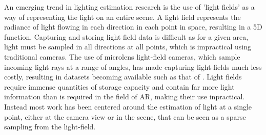 \documentclass[ %
                    author={Gavin Parker},
                supervisor={Dr. Neill Campbell},
                    degree={MEng},
                     title={Deep Siamese Networks for Illumination Estimation from Stereo Images},
                  subtitle={},
                      type={research},
                      year={2018} ]{dissertation}
\begin{document}
\newline
An emerging trend in lighting estimation research is the use of 'light fields' as a way of representing the light on an entire scene. A light field represents the radiance of light flowing in each direction in each point in space, resulting in a 5D function. Capturing and storing light field data is difficult as for a given area, light must be sampled in all directions at all points, which is impractical using traditional cameras. The use of microlens light-field cameras, which sample incoming light rays at a range of angles, has made capturing light-fields much less costly, resulting in datasets becoming available such as that of \cite{hazirbas17ddff}. Light fields require immense quantities of storage capacity and contain far more light information than is required in the field of AR, making their use inpractical. Instead most work has been centered around the estimation of light at a single point, either at the camera view or in the scene, that can be seen as a sparse sampling from the light-field.
\cite{790313}
\end{document}
